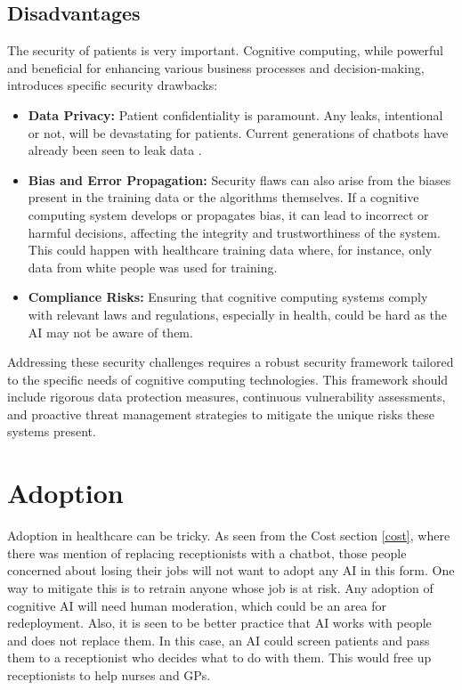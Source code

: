 \documentclass{article}
\begin{document}
\subsection{Disadvantages}
The security of patients is very important. Cognitive computing, while powerful and beneficial for enhancing various business processes and decision-making, introduces specific security drawbacks:
\begin{itemize}
	\item \textbf{Data Privacy:} Patient confidentiality is paramount. Any leaks, intentional or not, will be devastating for patients. Current generations of chatbots have already been seen to leak data \cite{wired}.

	\item \textbf{Bias and Error Propagation:} Security flaws can also arise from the biases present in the training data or the algorithms themselves. If a cognitive computing system develops or propagates bias, it can lead to incorrect or harmful decisions, affecting the integrity and trustworthiness of the system. This could happen with healthcare training data where, for instance, only data from white people was used for training.

	\item \textbf{Compliance Risks:} Ensuring that cognitive computing systems comply with relevant laws and regulations, especially in health, could be hard as the AI may not be aware of them.
\end{itemize}

Addressing these security challenges requires a robust security framework tailored to the specific needs of cognitive computing technologies. This framework should include rigorous data protection measures, continuous vulnerability assessments, and proactive threat management strategies to mitigate the unique risks these systems present.

\section{Adoption}
Adoption in healthcare can be tricky. As seen from the Cost section \ref{cost}, where there was mention of replacing receptionists with a chatbot, those people concerned about losing their jobs will not want to adopt any AI in this form. One way to mitigate this is to retrain anyone whose job is at risk. Any adoption of cognitive AI will need human moderation, which could be an area for redeployment. Also, it is seen to be better practice that AI works with people and does not replace them. In this case, an AI could screen patients and pass them to a receptionist who decides what to do with them. This would free up receptionists to help nurses and GPs.
\end{document}
